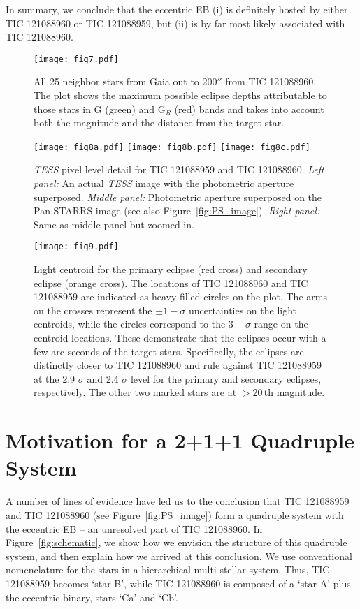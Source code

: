 \documentclass[fleqn,usenatbib]{mnras} %
\begin{document}
In summary, we conclude that the eccentric EB (i) is definitely hosted by either TIC 121088960 or TIC 121088959, but (ii) is by far most likely associated with TIC 121088960.

\begin{figure}
\texttt{[image: fig7.pdf]}
\caption{All 25 neighbor stars from Gaia out to 200$''$ from TIC 121088960.  The plot shows the maximum possible eclipse depths attributable to those stars in G (green) and G$_R$ (red) bands and takes into account both the magnitude and the distance from the target star.}
\label{fig:neighbors}
\end{figure}

\begin{figure*}
\texttt{[image: fig8a.pdf]}
\texttt{[image: fig8b.pdf]} 
\texttt{[image: fig8c.pdf]}
\caption{{\em TESS} pixel level detail for TIC 121088959 and TIC 121088960.  {\em Left panel:} An actual {\em TESS} image with the photometric aperture superposed. {\em Middle panel:} Photometric aperture superposed on the Pan-STARRS image (see also Figure~\ref{fig:PS_image}). {\em Right panel:} Same as middle panel but zoomed in.}
\label{fig:pixel_level}
\end{figure*}

\begin{figure}
\texttt{[image: fig9.pdf]}
\caption{Light centroid for the primary eclipse (red cross) and secondary eclipse (orange cross).  The locations of TIC 121088960 and TIC 121088959 are indicated as heavy filled circles on the plot.  The arms on the crosses represent the $\pm 1-\sigma$ uncertainties on the light centroids, while the circles correspond to the $3-\sigma$ range on the centroid locations. These demonstrate that the eclipses occur with a few arc seconds of the target stars.  Specifically, the eclipses are distinctly closer to TIC 121088960 and rule against TIC 121088959 at the 2.9 $\sigma$ and 2.4 $\sigma$ level for the primary and secondary eclipses, respectively. The other two marked stars are at $>20$\,th magnitude.}
\label{fig:centroids}
\end{figure}


\section{Motivation for a 2+1+1 Quadruple System}
\label{sec:motivation}
A number of lines of evidence have led us to the conclusion that TIC 121088959 and TIC 121088960 (see Figure~\ref{fig:PS_image}) form a quadruple system with the eccentric EB -- an unresolved part of TIC 121088960.  In Figure~\ref{fig:schematic}, we show how we envision the structure of this quadruple system, and then explain how we arrived at this conclusion. We use conventional nomenclature for the stars in a hierarchical multi-stellar system.  Thus, TIC 121088959 becomes `star B', while TIC 121088960 is composed of a `star A' plus the eccentric binary, stars `Ca' and `Cb'.
\end{document}
